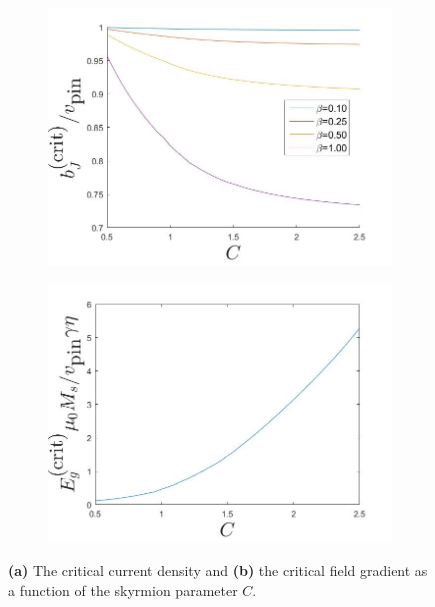 \begin{figure}[h!]
\centering
\begin{subfigure}{.49\textwidth}
  \centering
  \includegraphics[width=\linewidth]{Figures/CritCurrent.jpg}
  \caption{}
  \label{fig:CritCurrent}
\end{subfigure}
\begin{subfigure}{.49\textwidth}
  \centering
  \includegraphics[width=\linewidth]{Figures/CritField.jpg}
  \caption{}
  \label{fig:CritField}
\end{subfigure}
\caption{\textbf{(a)} The critical current density and \textbf{(b)} the critical field gradient as a function of the skyrmion parameter $C$.}
\label{fig:CritCurrentField}
\end{figure}

